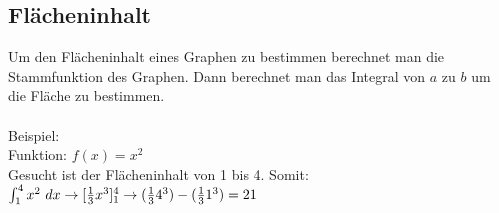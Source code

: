 \subsection{Flächeninhalt}
Um den Flächeninhalt eines Graphen zu bestimmen berechnet man die Stammfunktion des Graphen. 
Dann berechnet man das Integral von $a$ zu $b$ um die Fläche zu bestimmen. \\\\
Beispiel: \\
Funktion: 
$
f(x) = x^2
$
\\
Gesucht ist der Flächeninhalt von 1 bis 4. Somit: \\
$
\int_1^4 x^2\ dx \\\\
\rightarrow [\frac{1}{3}x^3]_1^4 \\\\
\rightarrow (\frac{1}{3}4^3) - (\frac{1}{3}1^3) = 21
$
